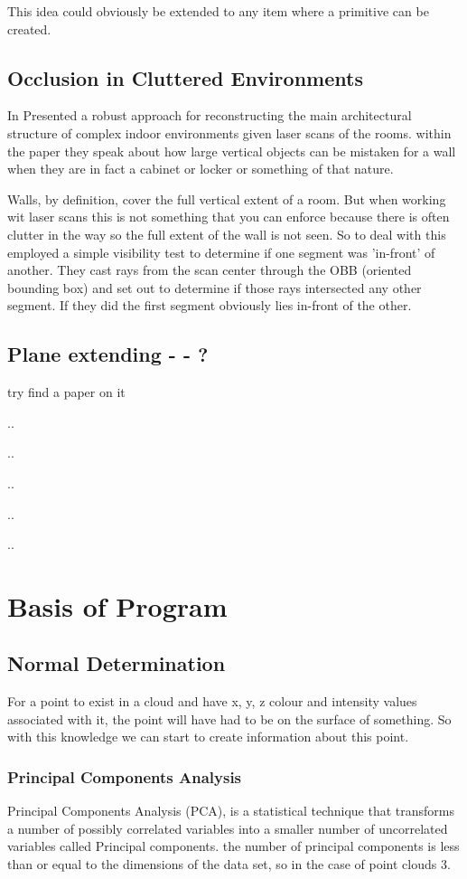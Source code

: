 		This idea could obviously be extended to any item where a primitive can be created. 
		
	\subsection{Occlusion in Cluttered Environments}
		In \citeyear{mura_automatic_2014} \citeauthor{mura_automatic_2014} Presented a robust approach for reconstructing the main architectural structure of complex indoor environments given laser scans of the rooms. within the paper they speak about how large vertical objects can be mistaken for a wall when they are in fact a cabinet or locker or something of that nature.
		
		Walls, by definition, cover the full vertical extent of a room. But when working wit laser scans this is not something that you can enforce because there is often clutter in the way so the full extent of the wall is not seen. So to deal with this \citeauthor{mura_automatic_2014} employed a simple visibility test to determine if one segment was 'in-front' of another. They cast rays from the scan center through the OBB (oriented bounding box) and set out to determine if those rays intersected any other segment. If they did the first segment obviously lies in-front of the other.
	
	\subsection{Plane extending - - ?}
		try find a paper on it
		
		..
		
		..
		
		..
		
		..
		
		..
	
	
\section{Basis of Program}
	\subsection{Normal Determination}
		For a point to exist in a cloud and have x, y, z colour and intensity values associated with it, the point will have had to be on the surface of something. So with this knowledge we can start to create information about this point.
		
		\subsubsection{Principal Components Analysis}
			Principal Components Analysis (PCA), is a statistical technique that transforms a number of possibly correlated variables into a smaller number of uncorrelated variables called Principal components. the number of principal components is less than or equal to the dimensions of the data set, so in the case of point clouds 3.
			
